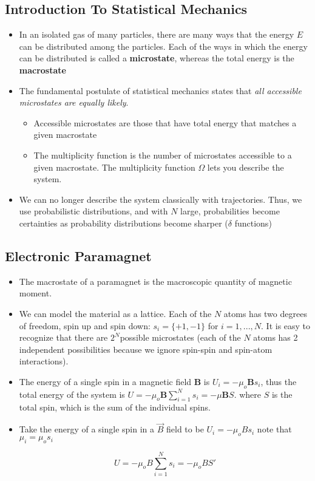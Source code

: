 \documentclass[8pt]{article}
\begin{document}
\subsection{Introduction To Statistical Mechanics}
\begin{itemize}
    \item In an isolated gas of many particles, there are many ways that the energy $E$ can be distributed among the particles. Each of the ways in which the energy can be distributed is called a \textbf{microstate}, whereas the total energy is the \textbf{macrostate}
    \item The fundamental postulate of statistical mechanics states that \textit{all accessible microstates are equally likely}.
    \begin{itemize}
        \item Accessible microstates are those that have total energy that matches a given macrostate
        \item The multiplicity function is the number of microstates accessible to a given macrostate. The multiplicity function $\Omega$ lets you describe the system.
    \end{itemize}
    \item We can no longer describe the system classically with trajectories. Thus, we use probabilistic distributions, and with $N$ large, probabilities become certainties as probability distributions become sharper ($\delta$ functions) 
\end{itemize}

\subsection{Electronic Paramagnet}
\begin{itemize}
\item The macrostate of a paramagnet is the macroscopic quantity of magnetic moment. 
\item We can model the material as a lattice. Each of the $N$ atoms has two degrees of freedom, spin up and spin down: $s_i = \{ +1, -1\}$ for $i = 1 , ..., N$. It is easy to recognize that there are $2^N$possible microstates (each of the $N$ atoms has 2 independent possibilities because we ignore spin-spin and spin-atom interactions).
\item The energy of a single spin in a magnetic field $\mathbf{B}$ is $U_i = -\mu_o \mathbf{B} s_i$, thus the total energy of the system is $U = - \mu_o \mathbf{B} \sum_{i=1}^{N} s_i = -\mu \mathbf{B} S$. where $S$ is the total spin, which is the sum of the individual spins. 

            \item Take the energy of a single spin in a $\vec{B}$ field to be $U_i = -\mu_o B s_i$ note that $\mu_i = \mu_o s_i$ 
   
\[U = - \mu_o B \sum_{i=1}^{N}s_i = - \mu _o B S'\]

\end{itemize}
\end{document}
